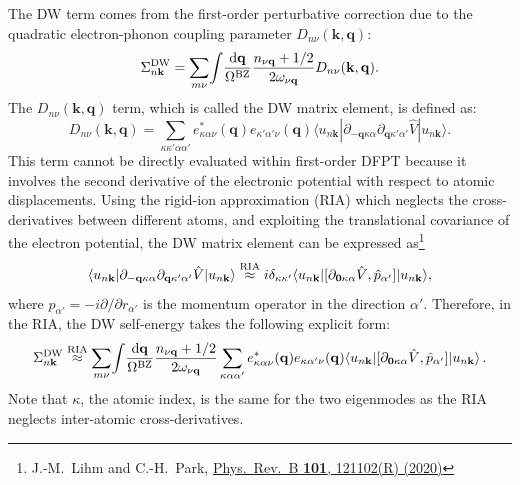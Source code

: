 \documentclass[a4paper,11pt,serif]{article}
\newcommand{\mb}[1]{\mathbf{#1}}
\begin{document}
\vspace{0.5cm}
The DW term comes from the first-order perturbative correction due to the quadratic electron-phonon coupling parameter $D_{n\nu}(\mb{k,q})$:
\begin{equation}
   \Sigma^{\rm DW}_{n\mb{k}} = \sum_{m\nu} \!\int\! \frac{\mathrm{d}\mathbf{q}}{\Omega^{\mathrm{BZ}}} \frac{n_{\nu\mb{q}} + 1/2}{2\omega_{\nu\mb{q}}} D_{n\nu}(\mb{k,q}).
\end{equation}
The $D_{n\nu}(\mb{k,q})$ term, which is called the DW matrix element, is defined as:
\begin{equation}
   D_{n\nu}(\mb{k,q}) = \sum_{\kappa\kappa'\alpha\alpha'} e^*_{\kappa\alpha\nu}(\mb{q}) e_{\kappa'\alpha'\nu}(\mb{q})
   \langle u_{n\mb{k}} | \partial_{-\mb{q}\kappa\alpha} \partial_{\mb{q}\kappa'\alpha'} \hat{V} | u_{n\mb{k}} \rangle.
\end{equation}
This term cannot be directly evaluated within first-order DFPT because it involves the second derivative of the electronic potential with respect to atomic displacements.
Using the rigid-ion approximation (RIA) which neglects the cross-derivatives between different atoms, and exploiting the translational covariance of the electron potential, the DW matrix element can be expressed as\footnote{J.-M.\ Lihm and C.-H.\ Park, \href{https://journals.aps.org/prb/abstract/10.1103/PhysRevB.101.121102}{Phys.\ Rev.\ B \textbf{101}, 121102(R) (2020)}}
\begin{equation}
   \langle u_{n\mb{k}} | \partial_{-\mb{q}\kappa\alpha} \partial_{\mb{q}\kappa'\alpha'} \hat{V} | u_{n\mb{k}} \rangle
   \stackrel{\rm RIA}{\approx}
   i \delta_{\kappa\kappa'} \langle u_{n\mb{k}} | [\partial_{\mb{0}\kappa\alpha} \hat{V}, \hat{p}_{\alpha'}] | u_{n\mb{k}}\rangle,
\end{equation}
where $\hat{p}_{\alpha'} = -i \partial / \partial r_{\alpha'}$ is the momentum operator in the direction $\alpha'$.
Therefore, in the RIA, the DW self-energy takes the following explicit form:
\begin{equation}
   \Sigma^{\rm DW}_{n\mb{k}}
   \stackrel{\rm RIA}{\approx}
   \sum_{m\nu} \!\int\! \frac{\mathrm{d}\mathbf{q}}{\Omega^{\mathrm{BZ}}} \frac{n_{\nu\mb{q}} + 1/2}{2\omega_{\nu\mb{q}}}
   \sum_{\kappa\alpha\alpha'} e^*_{\kappa\alpha\nu}(\mb{q}) e_{\kappa\alpha'\nu}(\mb{q})
   \langle u_{n\mb{k}} | [\partial_{\mb{0}\kappa\alpha} \hat{V}, \hat{p}_{\alpha'}] | u_{n\mb{k}} \rangle\,.
\end{equation}
Note that $\kappa$, the atomic index, is the same for the two eigenmodes as the RIA neglects inter-atomic cross-derivatives.
\end{document}
